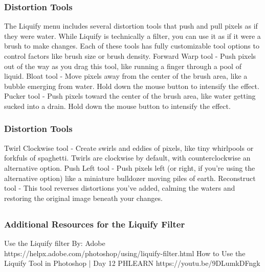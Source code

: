 \documentclass{beamer}
\begin{document}
\begin{frame}
	\frametitle{Distortion Tools}
	\begin{outline}
		\1 The Liquify menu includes several distortion tools that push and pull pixels as if they were water. 
		\2 While Liquify is technically a filter, you can use it as if it were a brush to make changes. 
		\2 Each of these tools has fully customizable tool options to control factors like brush size or brush density.
		\1 Forward Warp tool - 
		\2 Push pixels out of the way as you drag this tool, like running a finger through a pool of liquid.
		\1 Bloat tool - 
		\2 Move pixels away from the center of the brush area, like a bubble emerging from water. 
		\2 Hold down the mouse button to intensify the effect.
		\1 Pucker tool - 
		\2 Push pixels toward the center of the brush area, like water getting sucked into a drain. 
		\2 Hold down the mouse button to intensify the effect.
	\end{outline}
\end{frame}

\begin{frame}
	\frametitle{Distortion Tools}
	\begin{outline}
		\1 Twirl Clockwise tool - 
		\2 Create swirls and eddies of pixels, like tiny whirlpools or forkfuls of spaghetti. 
		\2 Twirls are clockwise by default, with counterclockwise an alternative option.
		\1 Push Left tool - 
		\2 Push pixels left (or right, if you’re using the alternative option) like a miniature bulldozer moving piles of earth.
		\1 Reconstruct tool - 
		\2 This tool reverses distortions you’ve added, calming the waters and restoring the original image beneath your changes.
	\end{outline}
\end{frame}


\subsection{}		
\begin{frame}
	\frametitle{Additional Resources for the Liquify Filter}
	\begin{outline}
		\1 Use the Liquify filter
		\2 By:  Adobe
		\2 https://helpx.adobe.com/photoshop/using/liquify-filter.html
		\1 How to Use the Liquify Tool in Photoshop | Day 12
		\2 PHLEARN
		\2 https://youtu.be/9DLumkDFngk
	\end{outline}
\end{frame}
	
\end{document}

